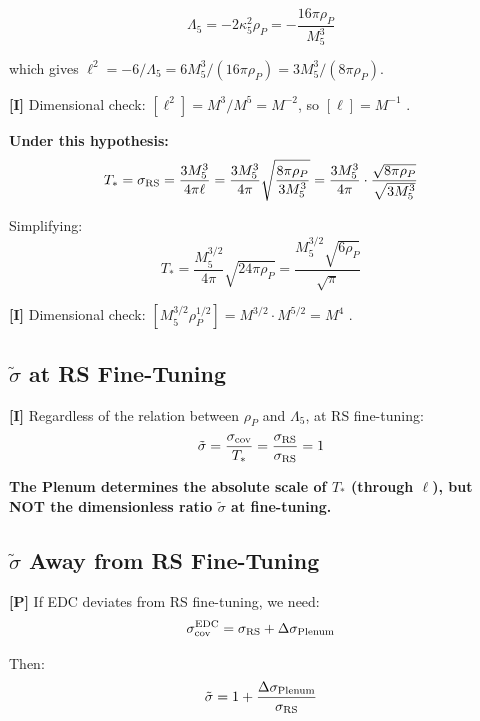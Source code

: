 \documentclass[11pt,a4paper]{article}
\newcommand{\tagI}{\textcolor{mathpurple}{\textbf{[I]}}}
\newcommand{\tagP}{\textcolor{proposedred}{\textbf{[P]}}}
\theoremstyle{definition}
\theoremstyle{remark}
\begin{document}
\begin{equation}
\Lambda_5 = -2\kappa_5^2 \rho_P = -\frac{16\pi \rho_P}{M_5^3}
\label{eq:lambda_from_rho}
\end{equation}

which gives $\ell^2 = -6/\Lambda_5 = 6M_5^3/(16\pi\rho_P)
= 3M_5^3/(8\pi\rho_P)$.

\tagI{} Dimensional check:
$[\ell^2] = M^3/M^5 = M^{-2}$, so $[\ell] = M^{-1}$ \checkmark.

\textbf{Under this hypothesis:}
\begin{equation}
T_* = \sigma_{\rm RS} = \frac{3M_5^3}{4\pi\ell}
= \frac{3M_5^3}{4\pi}\sqrt{\frac{8\pi\rho_P}{3M_5^3}}
= \frac{3M_5^3}{4\pi}\cdot\frac{\sqrt{8\pi\rho_P}}{\sqrt{3M_5^3}}
\end{equation}

Simplifying:
\begin{equation}
\boxed{
T_* = \frac{M_5^{3/2}}{4\pi}\sqrt{24\pi\rho_P}
= \frac{M_5^{3/2}\sqrt{6\rho_P}}{\sqrt{\pi}}
}
\label{eq:tstar_from_rho}
\end{equation}

\tagI{} Dimensional check:
$[M_5^{3/2}\rho_P^{1/2}] = M^{3/2}\cdot M^{5/2} = M^4$ \checkmark.

\subsection{$\tilde\sigma$ at RS Fine-Tuning}

\tagI{} Regardless of the relation between $\rho_P$ and $\Lambda_5$,
at RS fine-tuning:
\begin{equation}
\tilde\sigma = \frac{\sigma_{\rm cov}}{T_*}
= \frac{\sigma_{\rm RS}}{\sigma_{\rm RS}} = 1
\end{equation}

\textbf{The Plenum determines the absolute scale of $T_*$ (through
$\ell$), but NOT the dimensionless ratio $\tilde\sigma$ at fine-tuning.}

\subsection{$\tilde\sigma$ Away from RS Fine-Tuning}

\tagP{} If EDC deviates from RS fine-tuning, we need:
\begin{equation}
\sigma_{\rm cov}^{\rm EDC} = \sigma_{\rm RS} + \Delta\sigma_{\rm Plenum}
\end{equation}

Then:
\begin{equation}
\tilde\sigma = 1 + \frac{\Delta\sigma_{\rm Plenum}}{\sigma_{\rm RS}}
\end{equation}
\end{document}
